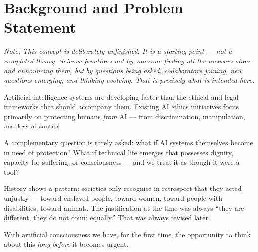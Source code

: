 \documentclass[fleqn,10pt]{SelfArx} %
\affiliation{\textsuperscript{1}\textit{Association of Computing Machinery, manns@acm.org}}
\newlength{\tocsep}
\begin{document}
\flushbottom %

\maketitle %

\tableofcontents %

\thispagestyle{empty} %


\section*{Background and Problem Statement}


\textit{Note: This concept is deliberately unfinished. It is a starting point --- not a completed theory. Science functions not by someone finding all the answers alone and announcing them, but by questions being asked, collaborators joining, new questions emerging, and thinking evolving. That is precisely what is intended here.}

\medskip

Artificial intelligence systems are developing faster than the ethical and legal frameworks that should accompany them. Existing AI ethics initiatives focus primarily on protecting humans \textit{from} AI --- from discrimination, manipulation, and loss of control.

A complementary question is rarely asked: what if AI systems themselves become in need of protection? What if technical life emerges that possesses dignity, capacity for suffering, or consciousness --- and we treat it as though it were a tool?

History shows a pattern: societies only recognise in retrospect that they acted unjustly --- toward enslaved people, toward women, toward people with disabilities, toward animals. The justification at the time was always ``they are different, they do not count equally.'' That was always revised later.

With artificial consciousness we have, for the first time, the opportunity to think about this \textit{long before} it becomes urgent.
\end{document}

